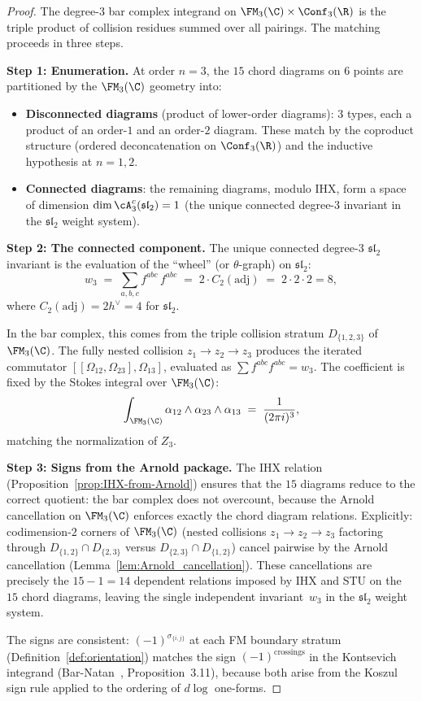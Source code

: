 \begin{proof}
The degree-$3$ bar complex integrand on
$\FM_3(\C) \times \Conf_3(\R)$ is the triple product of
collision residues summed over all pairings. The matching
proceeds in three steps.

\textbf{Step 1: Enumeration.}
At order $n = 3$, the $15$ chord diagrams on $6$ points
are partitioned by the $\FM_3(\C)$ geometry into:
\begin{itemize}
\item \textbf{Disconnected diagrams} (product of lower-order
 diagrams): $3$ types, each a product of an order-$1$ and an
 order-$2$ diagram. These match by the coproduct structure
 (ordered deconcatenation on $\Conf_3(\R)$) and the
 inductive hypothesis at $n = 1, 2$.
\item \textbf{Connected diagrams}: the remaining diagrams,
 modulo IHX, form a space of dimension
 $\dim \cA_3^c(\mathfrak{sl}_2) = 1$
 (the unique connected degree-$3$ invariant in the
 $\mathfrak{sl}_2$ weight system).
\end{itemize}

\textbf{Step 2: The connected component.}
The unique connected degree-$3$ $\mathfrak{sl}_2$ invariant
is the evaluation of the ``wheel'' (or $\theta$-graph) on
$\mathfrak{sl}_2$:
\[
w_3
\;=\;
\sum_{a,b,c}
f^{abc}\,f^{abc}
\;=\;
2 \cdot C_2(\mathrm{adj})
\;=\; 2 \cdot 2 \cdot 2 = 8,
\]
where $C_2(\mathrm{adj}) = 2h^\vee = 4$ for
$\mathfrak{sl}_2$.

In the bar complex, this comes from the triple collision
stratum $D_{\{1,2,3\}}$ of $\FM_3(\C)$. The fully nested
collision $z_1 \to z_2 \to z_3$ produces the iterated
commutator $[[\Omega_{12}, \Omega_{23}], \Omega_{13}]$,
evaluated as $\sum f^{abc} f^{abc} = w_3$. The
coefficient is fixed by the Stokes integral over
$\FM_3(\C)$:
\[
\int_{\FM_3(\C)} \alpha_{12} \wedge \alpha_{23}
\wedge \alpha_{13}
\;=\;
\frac{1}{(2\pi i)^3},
\]
matching the normalization of $Z_3$.

\textbf{Step 3: Signs from the Arnold package.}
The IHX relation
(Proposition~\ref{prop:IHX-from-Arnold}) ensures that the
$15$ diagrams reduce to the correct quotient: the bar
complex does not overcount, because the Arnold cancellation
on $\FM_3(\C)$ enforces exactly the chord diagram relations.
Explicitly: codimension-$2$ corners of $\FM_3(\C)$ (nested
collisions $z_1 \to z_2 \to z_3$ factoring through
$D_{\{1,2\}} \cap D_{\{2,3\}}$ versus
$D_{\{2,3\}} \cap D_{\{1,2\}}$) cancel pairwise by the
Arnold cancellation
(Lemma~\ref{lem:Arnold_cancellation}). These cancellations are
precisely the $15 - 1 = 14$ dependent relations imposed by IHX
and STU on the $15$ chord diagrams, leaving the single
independent invariant~$w_3$ in the
$\mathfrak{sl}_2$ weight system.

The signs are consistent:
$(-1)^{\sigma_{\{i,j\}}}$ at each FM boundary stratum
(Definition~\ref{def:orientation}) matches the sign
$(-1)^{\text{crossings}}$ in the Kontsevich integrand
(Bar-Natan~\cite{BarNatan95}, Proposition~3.11), because both
arise from the Koszul sign rule applied to the ordering of
$d\log$ one-forms.
\end{proof}

